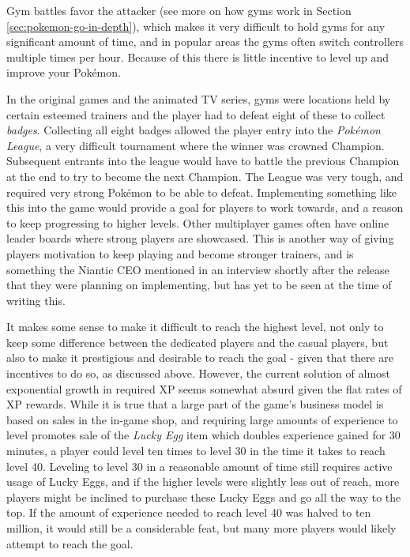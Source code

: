 Gym battles favor the attacker (see more on how gyms work in Section \ref{sec:pokemon-go-in-depth}), which makes it very difficult to hold gyms for any significant amount of time, and in popular areas the gyms often switch controllers multiple times per hour. Because of this there is little incentive to level up and improve your Pokémon.

In the original games and the animated TV series, gyms were locations held by certain esteemed trainers and the player had to defeat eight of these to collect \emph{badges}. Collecting all eight badges allowed the player entry into the \emph{Pokémon League}, a very difficult tournament where the winner was crowned Champion. Subsequent entrants into the league would have to battle the previous Champion at the end to try to become the next Champion. The League was very tough, and required very strong Pokémon to be able to defeat. Implementing something like this into the game would provide a goal for players to work towards, and a reason to keep progressing to higher levels. Other multiplayer games often have online leader boards where strong players are showcased. This is another way of giving players motivation to keep playing and become stronger trainers, and is something the Niantic CEO mentioned in an interview shortly after the release \cite{businessinsiderPogoFuture} that they were planning on implementing, but has yet to be seen at the time of writing this.

It makes some sense to make it difficult to reach the highest level, not only to keep some difference between the dedicated players and the casual players, but also to make it prestigious and desirable to reach the goal - given that there are incentives to do so, as discussed above. However, the current solution of almost exponential growth in required XP seems somewhat absurd given the flat rates of XP rewards. While it is true that a large part of the game's business model is based on sales in the in-game shop, and requiring large amounts of experience to level promotes sale of the \emph{Lucky Egg} item which doubles experience  gained for 30 minutes, a player could level ten times to level 30 in the time it takes to reach level 40. Leveling to level 30 in a reasonable amount of time still requires active usage of Lucky Eggs, and if the higher levels were slightly less out of reach, more players might be inclined to purchase these Lucky Eggs and go all the way to the top. If the amount of experience needed to reach level 40 was halved to ten million, it would still be a considerable feat, but many more players would likely attempt to reach the goal.

